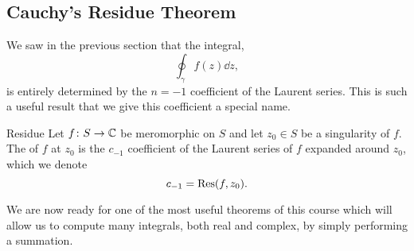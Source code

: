 \documentclass{article}
\begin{document}
    \subsection{Cauchy's Residue Theorem}
    We saw in the previous section that the integral,
    \[\oint_{\gamma} f(z) \dd{z},\]
    is entirely determined by the \(n = -1\) coefficient of the Laurent series.
    This is such a useful result that we give this coefficient a special name.
    \begin{definition}{Residue}{}
        Let \(f\colon S\to\mathbb{C}\) be meromorphic on \(S\) and let \(z_0\in S\) be a singularity of \(f\).
        The  of \(f\) at \(z_0\) is the \(c_{-1}\) coefficient of the Laurent series of \(f\) expanded around \(z_0\), which we denote
        \[c_{-1} = \Res(f, z_0).\]
    \end{definition}
    We are now ready for one of the most useful theorems of this course which will allow us to compute many integrals, both real and complex, by simply performing a summation.
    
\end{document}
